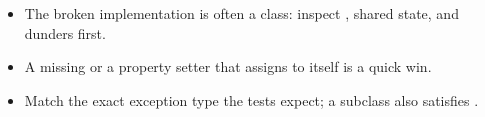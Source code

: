 \documentclass[10pt,a4paper]{article}
\begin{document}
\begin{examlensbox}
\begin{itemize}
\item The broken implementation is often a class: inspect , shared state, and dunders first.
\item A missing  or a property setter that assigns to itself is a quick win.
\item Match the exact exception type the tests expect; a subclass also satisfies .
\end{itemize}
\end{examlensbox}
\bugjournalifspace
\end{document}

